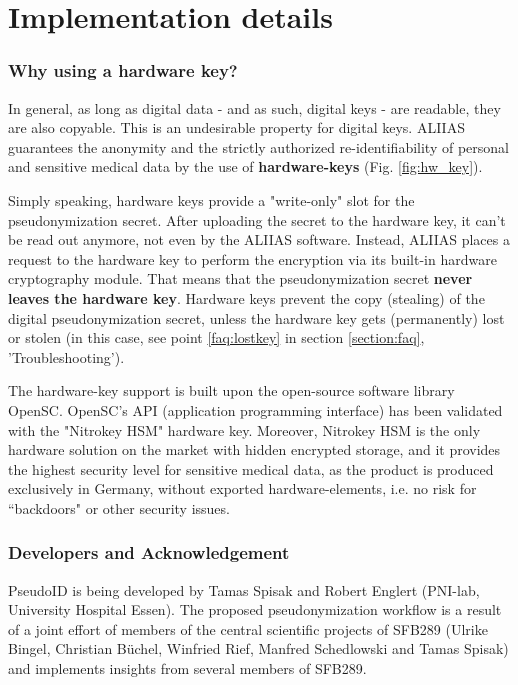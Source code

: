 
\section{Implementation details}
\label{section:implementation}
\subsubsection*{Why using a hardware key?}

In general, as long as digital data - and as such, digital keys - are readable, they are also copyable. This is an undesirable property for digital keys.
ALIIAS guarantees the anonymity and the strictly authorized re-identifiability of personal and sensitive medical data by the use of \textbf{hardware-keys} (Fig. \ref{fig:hw_key}).

Simply speaking, hardware keys provide a "write-only" slot for the pseudonymization secret. After uploading the secret to the hardware key, it can't be read out anymore, not even by the ALIIAS software. Instead, ALIIAS places a request to the hardware key to perform the encryption via its built-in hardware cryptography module. That means that the pseudonymization secret \textbf{never leaves the hardware key}. Hardware keys prevent the copy (stealing) of the digital pseudonymization secret, unless the hardware key gets (permanently) lost or stolen (in this case, see point \ref{faq:lostkey} in section \ref{section:faq}, 'Troubleshooting').

The hardware-key support is built upon the open-source software library OpenSC. OpenSC's API (application programming interface) has been validated with the "Nitrokey HSM" hardware key. Moreover, Nitrokey HSM is the only hardware solution on the market with hidden encrypted storage, and it provides the highest security level for sensitive medical data, as the product is produced exclusively in Germany, without exported hardware-elements, i.e. no risk for “backdoors" or other security issues.

\subsubsection*{Developers and Acknowledgement}

PseudoID is being developed by Tamas Spisak and Robert Englert (PNI-lab, University Hospital Essen). The proposed pseudonymization workflow is a result of a joint effort of members of the central scientific projects of SFB289 (Ulrike Bingel, Christian Büchel, Winfried Rief, Manfred Schedlowski and Tamas Spisak) and implements insights from several members of SFB289.
